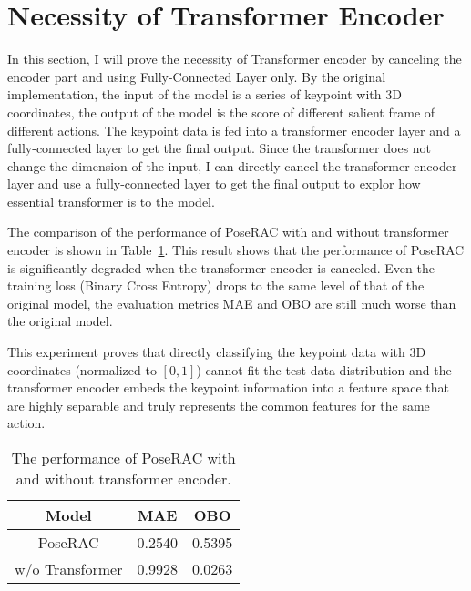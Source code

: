 \documentclass[10pt,twocolumn,letterpaper]{article}
\begin{document}


    \section{Necessity of Transformer Encoder}
    \label{sec:necessity}

    In this section, I will prove the necessity of Transformer encoder by canceling the encoder part and using Fully-Connected Layer only.
    By the original implementation, the input of the model is a series of keypoint with 3D coordinates, the output of the model is the
    score of different salient frame of different actions.
    The keypoint data is fed into a transformer encoder layer and a fully-connected layer to get the final output.
    Since the transformer does not change the dimension of the input, I can directly cancel the transformer encoder layer and use
    a fully-connected layer to get the final output to explor how essential transformer is to the model.

    The comparison of the performance of PoseRAC with and without transformer encoder is shown in Table~\ref{tab:w/o transformer}.
    This result shows that the performance of PoseRAC is significantly degraded when the transformer encoder is canceled.
    Even the training loss (Binary Cross Entropy) drops to the same level of that of the original model, the evaluation metrics
    MAE and OBO are still much worse than the original model.

    This experiment proves that directly classifying the keypoint data with 3D coordinates (normalized to $[0,1]$) cannot
    fit the test data distribution and the transformer encoder embeds the keypoint information into a feature space that
    are highly separable and truly represents the common features for the same action.

    \begin{table}
        \centering
        \begin{tabular}[H]{c c c}
            Model           & MAE    & OBO    \\
            \hline
            \hline
            PoseRAC         & 0.2540 & 0.5395 \\
            \hline
            w/o Transformer & 0.9928 & 0.0263 \\
        \end{tabular}
        \caption{The performance of PoseRAC with and without transformer encoder.}
        \label{tab:w/o transformer}
    \end{table}
\end{document}
